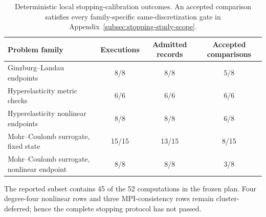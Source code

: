 \begin{table}[t]
  \centering
  \caption{Deterministic local stopping-calibration outcomes. An accepted comparison satisfies every family-specific same-discretization gate in Appendix~\ref{subsec:stopping-study-scope}.}
  \label{tab:stopping-local-status}
  \begin{tabularx}{\linewidth}{L{1.70}C{0.75}C{0.75}C{0.75}}
    \toprule
    Problem family & Executions & Admitted records & Accepted comparisons \\
    \midrule
    Ginzburg--Landau endpoints & 8/8 & 8/8 & 5/8 \\
    Hyperelasticity metric checks & 6/6 & 6/6 & 6/6 \\
    Hyperelasticity nonlinear endpoints & 8/8 & 8/8 & 6/8 \\
    Mohr--Coulomb surrogate, fixed state & 15/15 & 13/15 & 8/15 \\
    Mohr--Coulomb surrogate, nonlinear endpoint & 8/8 & 8/8 & 3/8 \\
    \bottomrule
  \end{tabularx}
  \begin{minipage}{0.96\linewidth}\small
    The reported subset contains 45 of the 52 computations in the frozen plan. Four degree-four nonlinear rows and three MPI-consistency rows remain cluster-deferred; hence the complete stopping protocol has not passed.
  \end{minipage}
\end{table}

